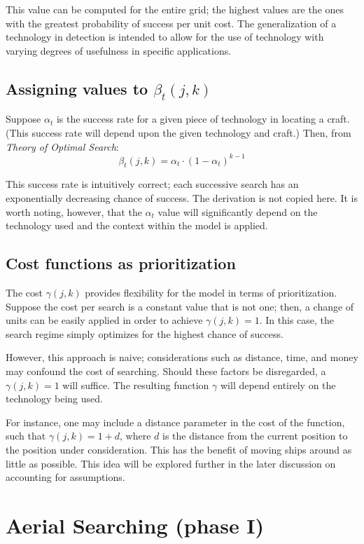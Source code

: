 \documentclass[a4paper]{article}
\begin{document}
This value can be computed for the entire grid; the highest values are the ones with the greatest probability of success per unit cost. The generalization of a technology in detection is intended to allow for the use of technology with varying degrees of usefulness in specific applications.

\subsection{Assigning values to $\beta_t(j,k)$}

Suppose $\alpha_t$ is the success rate for a given piece of technology in locating a craft. (This success rate will depend upon the given technology and craft.) Then, from \textit{Theory of Optimal Search}: \[\beta_t(j,k)=\alpha_t\cdot(1-\alpha_t)^{k-1}\]

This success rate is intuitively correct; each successive search has an exponentially decreasing chance of success. The derivation is not copied here. It is worth noting, however, that the $\alpha_t$ value will significantly depend on the technology used and the context within the model is applied.

\subsection{Cost functions as prioritization}

The cost $\gamma(j,k)$ provides flexibility for the model in terms of prioritization. Suppose the cost per search is a constant value that is not one; then, a change of units can be easily applied in order to achieve $\gamma(j,k)=1$. In this case, the search regime simply optimizes for the highest chance of success. 

However, this approach is naive; considerations such as distance, time, and money may confound the cost of searching. Should these factors be disregarded, a $\gamma(j,k)=1$ will suffice. The resulting function $\gamma$ will depend entirely on the technology being used. 

For instance, one may include a distance parameter in the cost of the function, such that $\gamma(j,k)=1+d$, where $d$ is the distance from the current position to the position under consideration. This has the benefit of moving ships around as little as possible. This idea will be explored further in the later discussion on accounting for assumptions. 

\section{Aerial Searching (phase I)}
\end{document}
